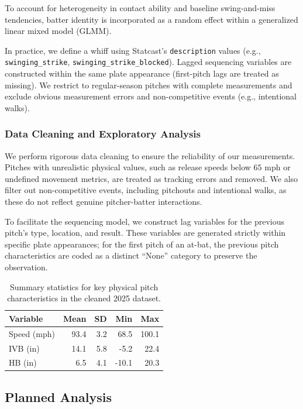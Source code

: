 \documentclass[11pt]{article}
\begin{document}
To account for heterogeneity in contact ability and baseline swing-and-miss tendencies, batter identity is incorporated as a random effect within a generalized linear mixed model (GLMM). 

In practice, we define a whiff using Statcast's \texttt{description} values (e.g., \texttt{swinging\_strike}, \texttt{swinging\_strike\_blocked}). Lagged sequencing variables are constructed within the same plate appearance (first-pitch lags are treated as missing). We restrict to regular-season pitches with complete measurements and exclude obvious measurement errors and non-competitive events (e.g., intentional walks).

\subsubsection{Data Cleaning and Exploratory Analysis}
We perform rigorous data cleaning to ensure the reliability of our measurements. Pitches with unrealistic physical values, such as release speeds below $65$ mph or undefined movement metrics, are treated as tracking errors and removed. We also filter out non-competitive events, including pitchouts and intentional walks, as these do not reflect genuine pitcher-batter interactions. 

To facilitate the sequencing model, we construct lag variables for the previous pitch's type, location, and result. These variables are generated strictly within specific plate appearances; for the first pitch of an at-bat, the previous pitch characteristics are coded as a distinct ``None'' category to preserve the observation.

\begin{table}[ht]
\centering
\begin{tabular}{lrrrr}
  \hline
 Variable & Mean & SD & Min & Max \\ 
  \hline
Speed (mph) & 93.4 & 3.2 & 68.5 & 100.1 \\ 
  IVB (in) & 14.1 & 5.8 & -5.2 & 22.4 \\ 
  HB (in) & 6.5 & 4.1 & -10.1 & 20.3 \\ 
   \hline
\end{tabular}
\caption{Summary statistics for key physical pitch characteristics in the cleaned 2025 dataset.}
\label{tab:summary}
\end{table}


\subsection{Planned Analysis}
\end{document}
